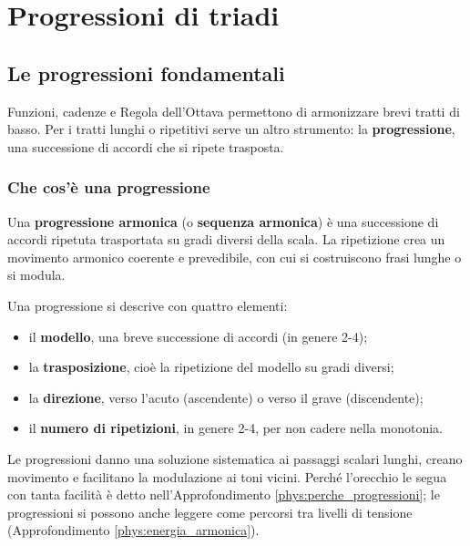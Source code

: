 \part{Progressioni di triadi}

\chapter{Le progressioni fondamentali}
\label{chap:progressioni_armoniche}

Funzioni, cadenze e Regola dell'Ottava permettono di armonizzare brevi tratti di basso. Per i tratti lunghi o ripetitivi serve un altro strumento: la \textbf{progressione}, una successione di accordi che si ripete trasposta.

\section{Che cos'è una progressione}
\label{sec:definizione_progressione}

\begin{definizione}
	\label{def:progressione_armonica}
	Una \textbf{progressione armonica} (o \textbf{sequenza armonica}) è una successione di accordi ripetuta trasportata su gradi diversi della scala. La ripetizione crea un movimento armonico coerente e prevedibile, con cui si costruiscono frasi lunghe o si modula.
\end{definizione}

Una progressione si descrive con quattro elementi:
\begin{itemize}
	\item il \textbf{modello}, una breve successione di accordi (in genere 2-4);
	\item la \textbf{trasposizione}, cioè la ripetizione del modello su gradi diversi;
	\item la \textbf{direzione}, verso l'acuto (ascendente) o verso il grave (discendente);
	\item il \textbf{numero di ripetizioni}, in genere 2-4, per non cadere nella monotonia.
\end{itemize}

Le progressioni danno una soluzione sistematica ai passaggi scalari lunghi, creano movimento e facilitano la modulazione ai toni vicini. Perché l'orecchio le segua con tanta facilità è detto nell'Approfondimento \ref{phys:perche_progressioni}; le progressioni si possono anche leggere come percorsi tra livelli di tensione (Approfondimento \ref{phys:energia_armonica}).

